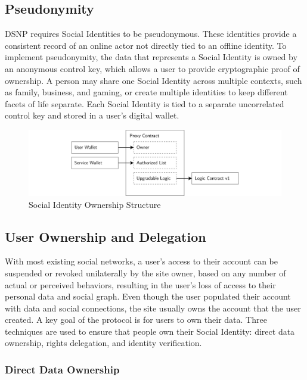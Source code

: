 \documentclass[12pt,letterpaper]{article}
\begin{document}
\subsection{Pseudonymity}\label{sec:pseudonymity}

DSNP requires Social Identities to be pseudonymous. These identities provide a consistent
record of an online actor not directly tied to an offline identity. To implement
pseudonymity, the data that represents a Social Identity is owned by an anonymous control
key, which allows a user to provide cryptographic proof of ownership. A person may share one
Social Identity across multiple contexts, such as family, business, and gaming, or create
multiple identities to keep different facets of life separate. Each Social Identity is tied
to a separate uncorrelated control key and stored in a user's digital wallet.

\begin{figure}
	\includegraphics[width=\linewidth]{figures/Social Identity Ownership Structure.png}
	\caption{Social Identity Ownership Structure}
	\label{fig:1}
\end{figure}

\subsection{User Ownership and Delegation}\label{sec:user_ownership and_delegation}

With most existing social networks, a user's access to their account can be suspended or
revoked unilaterally by the site owner, based on any number of actual or perceived
behaviors, resulting in the user's loss of access to their personal data and social graph.
Even though the user populated their account with data and social connections, the site
usually owns the account that the user created. A key goal of the protocol is for users to
own their data. Three techniques are used to ensure that people own their Social Identity:
direct data ownership, rights delegation, and identity verification.

\subsubsection{Direct Data Ownership}
\end{document}
